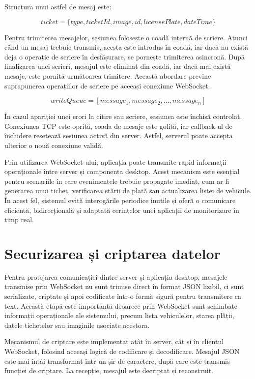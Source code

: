 Structura unui astfel de mesaj este:

\[
    ticket = \{type, ticketId, image, id, licensePlate, dateTime\}
\]

Pentru trimiterea mesajelor, sesiunea folosește o coadă internă de scriere. Atunci când un mesaj trebuie transmis, acesta este introdus în coadă, iar dacă nu există deja o operație de scriere în desfășurare, se pornește trimiterea asincronă. După finalizarea unei scrieri, mesajul este eliminat din coadă, iar dacă mai există mesaje, este pornită următoarea trimitere. Această abordare previne suprapunerea operațiilor de scriere pe aceeași conexiune WebSocket.

\[
    writeQueue = [message_1, message_2, \ldots, message_n]
\]

În cazul apariției unei erori la citire sau scriere, sesiunea este închisă controlat. Conexiunea TCP este oprită, coada de mesaje este golită, iar callback-ul de închidere resetează sesiunea activă din server. Astfel, serverul poate accepta ulterior o nouă conexiune validă.

Prin utilizarea WebSocket-ului, aplicația poate transmite rapid informații operaționale între server și componenta desktop. Acest mecanism este esențial pentru scenariile în care evenimentele trebuie propagate imediat, cum ar fi generarea unui tichet, verificarea stării de plată sau actualizarea listei de vehicule. În acest fel, sistemul evită interogările periodice inutile și oferă o comunicare eficientă, bidirecțională și adaptată cerințelor unei aplicații de monitorizare în timp real.

\section{Securizarea și criptarea datelor}

Pentru protejarea comunicației dintre server și aplicația desktop, mesajele transmise prin WebSocket nu sunt trimise direct în format JSON lizibil, ci sunt serializate, criptate și apoi codificate într-o formă sigură pentru transmitere ca text. Această etapă este importantă deoarece prin WebSocket sunt schimbate informații operaționale ale sistemului, precum lista vehiculelor, starea plății, datele tichetelor sau imaginile asociate acestora.

Mecanismul de criptare este implementat atât în server, cât și în clientul WebSocket, folosind aceeași logică de codificare și decodificare. Mesajul JSON este mai întâi transformat într-un șir de caractere, după care este transmis funcției de criptare. La recepție, mesajul este decriptat și reconstruit.

